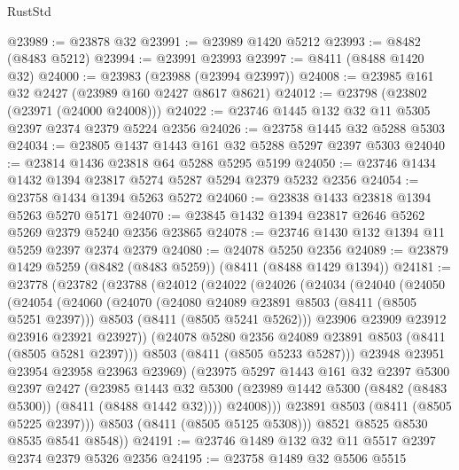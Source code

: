 \begin{lexlean}{RustStd}
\begin{coremodule}
@23989 := @23878 @32
@23991 := @23989 @1420 @5212
@23993 := @8482 (@8483 @5212)
@23994 := @23991 @23993
@23997 := @8411 (@8488 @1420 @32)
@24000 := @23983 (@23988 (@23994 @23997))
@24008 := @23985 @161 @32 @2427 (@23989 @160 @2427 @8617 @8621)
@24012 := @23798 (@23802 (@23971 (@24000 @24008)))
@24022 := @23746 @1445 @132 @32 @11 @5305 @2397 @2374 @2379 @5224 @2356
@24026 := @23758 @1445 @32 @5288 @5303
@24034 := @23805 @1437 @1443 @161 @32 @5288 @5297 @2397 @5303
@24040 := @23814 @1436 @23818 @64 @5288 @5295 @5199
@24050 := @23746 @1434 @1432 @1394 @23817 @5274 @5287 @5294 @2379 @5232 @2356
@24054 := @23758 @1434 @1394 @5263 @5272
@24060 := @23838 @1433 @23818 @1394 @5263 @5270 @5171
@24070 := @23845 @1432 @1394 @23817 @2646 @5262 @5269 @2379 @5240 @2356 @23865
@24078 := @23746 @1430 @132 @1394 @11 @5259 @2397 @2374 @2379
@24080 := @24078 @5250 @2356
@24089 := @23879 @1429 @5259 (@8482 (@8483 @5259)) (@8411 (@8488 @1429 @1394))
@24181 := @23778
    (@23782
      (@23788
        (@24012
          (@24022
            (@24026
              (@24034
                (@24040
                  (@24050
                    (@24054
                      (@24060
                        (@24070
                          (@24080 @24089 @23891 @8503 (@8411 (@8505 @5251 @2397)))
                          @8503
                          (@8411 (@8505 @5241 @5262)))
                        @23906
                        @23909
                        @23912
                        @23916
                        @23921
                        @23927))
                    (@24078 @5280 @2356 @24089 @23891 @8503 (@8411 (@8505 @5281 @2397)))
                    @8503
                    (@8411 (@8505 @5233 @5287)))
                  @23948
                  @23951
                  @23954
                  @23958
                  @23963
                  @23969)
                (@23975
                  @5297
                  @1443
                  @161
                  @32
                  @2397
                  @5300
                  @2397
                  @2427
                  (@23985
                    @1443
                    @32
                    @5300
                    (@23989 @1442 @5300 (@8482 (@8483 @5300)) (@8411 (@8488 @1442 @32))))
                  @24008)))
            @23891
            @8503
            (@8411 (@8505 @5225 @2397)))
          @8503
          (@8411 (@8505 @5125 @5308)))
        @8521
        @8525
        @8530
        @8535
        @8541
        @8548))
@24191 := @23746 @1489 @132 @32 @11 @5517 @2397 @2374 @2379 @5326 @2356
@24195 := @23758 @1489 @32 @5506 @5515

\end{coremodule}
\end{lexlean}
